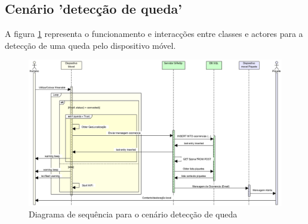 \FloatBarrier\subsection{Cenário 'detecção de queda'}

A figura \ref{fig:sequência_sistema} representa o funcionamento e interacções entre classes e actores para a detecção de uma queda pelo dispositivo móvel.

\begin{figure}[!htb]
	\centering
	\includegraphics[width=\textwidth]{figuras/sequence_diagram_system_2.png}
	\caption{Diagrama de sequência para o cenário detecção de queda}
	\label{fig:sequência_sistema}
\end{figure}
